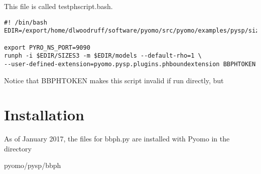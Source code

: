\documentclass[12pt]{article}
\begin{document}
This file is called testphscript.bash.
\begin{verbatim}
#! /bin/bash
EDIR=/export/home/dlwoodruff/software/pyomo/src/pyomo/examples/pysp/sizes

export PYRO_NS_PORT=9090
runph -i $EDIR/SIZES3 -m $EDIR/models --default-rho=1 \
--user-defined-extension=pyomo.pysp.plugins.phboundextension BBPHTOKEN
\end{verbatim}

Notice that BBPHTOKEN makes this script invalid if run directly, but 

\section{Installation}

As of January 2017, the files for bbph.py are installed with Pyomo in the directory

pyomo/pysp/bbph



\end{document}
